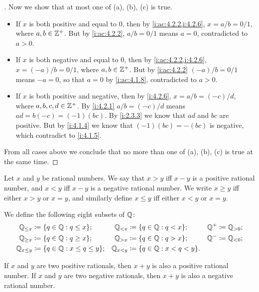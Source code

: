 \begin{proof}[]
  Now we show that at most one of (a), (b), (c) is true.
  \begin{itemize}
    \item If \(x\) is both positive and equal to \(0\), then by \cref{i:ac:4.2.2,i:4.2.6}, \(x = a / b = 0 / 1\), where \(a, b \in \mathbb{Z}^+\).
          But by \cref{i:ac:4.2.2}, \(a / b = 0 / 1\) means \(a = 0\), contradicted to \(a > 0\).
    \item If \(x\) is both negative and equal to \(0\), then by \cref{i:ac:4.2.2,i:4.2.6}, \(x = (-a) / b = 0 / 1\), where \(a, b \in \mathbb{Z}^+\).
          But by \cref{i:ac:4.2.2} \((-a) / b = 0 / 1\) means \(-a = 0\), so that \(a = 0\) by \cref{i:ac:4.1.8}, contradicted to \(a > 0\).
    \item If \(x\) is both positive and negative, then by \cref{i:4.2.6}, \(x = a / b = (-c) / d\), where \(a, b, c, d \in \mathbb{Z}^+\).
          By \cref{i:4.2.1} \(a / b = (-c) / d\) means \(ad = b(-c) = (-1)(bc)\).
          By \cref{i:2.3.3} we know that \(ad\) and \(bc\) are positive.
          But by \cref{i:4.1.4} we know that \((-1)(bc) = -(bc)\) is negative, which contradict to \cref{i:4.1.5}.
  \end{itemize}
  From all cases above we conclude that no more than one of (a), (b), (c) is true at the same time.
\end{proof}

\begin{defn}\label{i:4.2.8}
  Let \(x\) and \(y\) be rational numbers.
  We say that \(x > y\) iff \(x - y\) is a positive rational number, and \(x < y\) iff \(x - y\) is a negative rational number.
  We write \(x \geq y\) iff either \(x > y\) or \(x = y\), and similarly define \(x \leq y\) iff either \(x < y\) or \(x = y\).

  We define the following eight subsets of \(\mathbb{Q}\):
  \begin{align*}
    \Q_{\leq x}   & \coloneqq \set{q \in \Q : q \leq x};        & \Q_{< x}   & \coloneqq \set{q \in \Q : q < x};     & \Q^+ & \coloneqq \Q_{> 0}; \\
    \Q_{\geq x}   & \coloneqq \set{q \in \Q : q \geq x};        & \Q_{> x}   & \coloneqq \set{q \in \Q : q > x};     & \Q^- & \coloneqq \Q_{< 0}; \\
    \Q_{x \leq y} & \coloneqq \set{q \in \Q : x \leq q \leq y}; & \Q_{x < y} & \coloneqq \set{q \in \Q : x < q < y}. &      &
  \end{align*}
\end{defn}

\begin{ac}\label{i:ac:4.2.6}
  If \(x\) and \(y\) are two positive rationals, then \(x + y\) is also a positive rational number.
  If \(x\) and \(y\) are two negative rationals, then \(x + y\) is also a negative rational number.
\end{ac}

